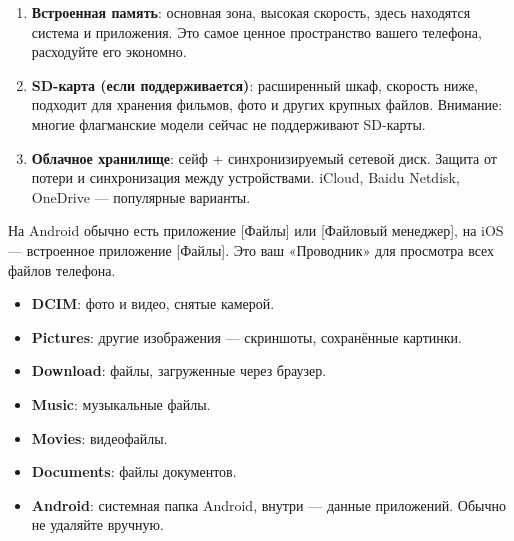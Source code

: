 


\begin{enumerate}
  \item \textbf{Встроенная память}: основная зона, высокая скорость, здесь находятся система и приложения. Это самое ценное пространство вашего телефона, расходуйте его экономно.
  \item \textbf{SD-карта (если поддерживается)}: расширенный шкаф, скорость ниже, подходит для хранения фильмов, фото и других крупных файлов. Внимание: многие флагманские модели сейчас не поддерживают SD-карты.
  \item \textbf{Облачное хранилище}: сейф + синхронизируемый сетевой диск. Защита от потери и синхронизация между устройствами. iCloud, Baidu Netdisk, OneDrive — популярные варианты.
\end{enumerate}


На Android обычно есть приложение [Файлы] или [Файловый менеджер], на iOS — встроенное приложение [Файлы]. Это ваш «Проводник» для просмотра всех файлов телефона.


\begin{itemize}
  \item \textbf{DCIM}: фото и видео, снятые камерой.
  \item \textbf{Pictures}: другие изображения — скриншоты, сохранённые картинки.
  \item \textbf{Download}: файлы, загруженные через браузер.
  \item \textbf{Music}: музыкальные файлы.
  \item \textbf{Movies}: видеофайлы.
  \item \textbf{Documents}: файлы документов.
  \item \textbf{Android}: системная папка Android, внутри — данные приложений. Обычно не удаляйте вручную.
\end{itemize}

